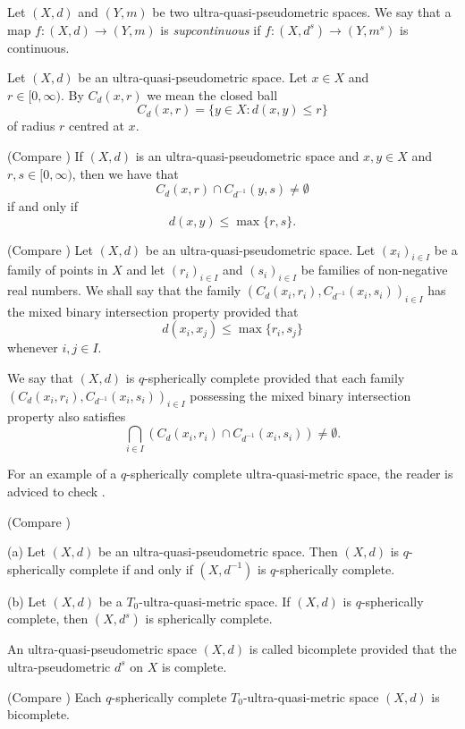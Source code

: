 \documentclass[10pt,a4paper]{article}
\begin{document}
 \label{supcontinuous} {Let $(X,d)$ and $(Y,m)$ be two ultra-quasi-pseudometric spaces. We say that a map $f:(X,d)\to (Y,m)$ is {\em supcontinuous} if $f:(X,d^s)\to (Y,m^s)$ is continuous.

Let $(X,d)$ be an ultra-quasi-pseudometric space. Let $x\in X$ and \\$r\in [0,\infty)$. By $C_d(x,r)$ we mean the closed ball \[ C_d(x,r)=\lbrace y\in X: d(x,y)\leq r\rbrace \] of radius $r$ centred at $x$.

\lemma (Compare \cite[Lemma 9]{KunziOlela}) If $(X,d)$ is an ultra-quasi-pseudometric space and $x,y\in X$ and $r,s\in [0,\infty)$, then we have that \[ C_d(x,r)\cap C_ {d^{-1}}(y,s)\neq \emptyset \] if and only if \[d(x,y)\leq \max\{ r,s\}.\]

 (Compare \cite[Definition 2]{KunziOlela}) Let $(X,d)$ be an ultra-quasi-pseudometric space. Let $(x_i)_{i\in I}$ be a family of points in $X$ and let $(r_i)_{i\in I}$ and $(s_i)_{i\in I}$ be families of non-negative real numbers. We shall say that the family $(C_d(x_i,r_i),C_{d^{-1}}(x_i,s_i))_{i\in I}$ has the mixed binary intersection property provided that \[ d(x_i,x_j)\leq \max\lbrace r_i, s_j\rbrace \]whenever $i,j\in I$.

 We say that $(X,d)$ is $q$-spherically complete provided that each family $(C_d(x_i,r_i),C_{d^{-1}}(x_i,s_i))_{i\in I}$ possessing the mixed binary intersection property also satisfies  $$ \bigcap_{i\in I}\left( C_d(x_i,r_i)\cap C_{d^{-1}}(x_i,s_i) \right)\neq \emptyset.$$

For an example of a $q$-spherically complete ultra-quasi-metric space, the reader is adviced to check \cite[Example 2]{KunziOlela}.

\proposition (Compare \cite[Proposition 2]{KunziOlela})

(a) Let $(X,d)$ be an ultra-quasi-pseudometric space. Then $(X,d)$ is $q$-spherically complete if and only if $(X,d^{-1})$ is $q$-spherically complete.

(b) Let $(X,d)$ be a $T_0$-ultra-quasi-metric space. If $(X,d)$ is $q$-spherically complete, then $(X,d^s)$ is spherically complete.

 An ultra-quasi-pseudometric space $(X,d)$ is called bicomplete provided that the ultra-pseudometric $d^s$ on $X$ is complete.

\proposition (Compare \cite[Proposition 3]{KunziOlela}) Each $q$-spherically complete $T_0$-ultra-quasi-metric space $(X,d)$ is bicomplete.

}
\end{document}
